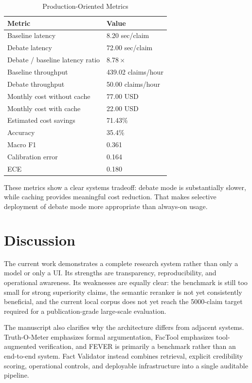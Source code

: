 \documentclass[conference]{IEEEtran}
\begin{document}
\begin{table}[t]
\centering
\caption{Production-Oriented Metrics}
\label{tab:production}
\renewcommand{\arraystretch}{1.1}
\begin{tabular}{p{4.3cm} p{1.9cm}}
\toprule
\textbf{Metric} & \textbf{Value} \\
\midrule
Baseline latency & 8.20 sec/claim \\
Debate latency & 72.00 sec/claim \\
Debate / baseline latency ratio & 8.78\,$\times$ \\
Baseline throughput & 439.02 claims/hour \\
Debate throughput & 50.00 claims/hour \\
Monthly cost without cache & 77.00 USD \\
Monthly cost with cache & 22.00 USD \\
Estimated cost savings & 71.43\% \\
Accuracy & 35.4\% \\
Macro F1 & 0.361 \\
Calibration error & 0.164 \\
ECE & 0.180 \\
\bottomrule
\end{tabular}
\end{table}

These metrics show a clear systems tradeoff: debate mode is substantially slower, while caching provides meaningful cost reduction. That makes selective deployment of debate mode more appropriate than always-on usage.

\section{Discussion}
The current work demonstrates a complete research system rather than only a model or only a UI. Its strengths are transparency, reproducibility, and operational awareness. Its weaknesses are equally clear: the benchmark is still too small for strong superiority claims, the semantic reranker is not yet consistently beneficial, and the current local corpus does not yet reach the 5000-claim target required for a publication-grade large-scale evaluation.

The manuscript also clarifies why the architecture differs from adjacent systems. Truth-O-Meter emphasizes formal argumentation, FacTool emphasizes tool-augmented verification, and FEVER is primarily a benchmark rather than an end-to-end system. Fact Validator instead combines retrieval, explicit credibility scoring, operational controls, and deployable infrastructure into a single auditable pipeline.
\end{document}
